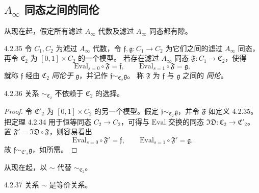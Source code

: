 
\subsection{$A_\infty$ 同态之间的同伦}
\label{subsec:4-2-2}

从现在起，假定所有滤过 $A_\infty$ 代数及滤过 $A_\infty$ 同态都有隙。

\begin{definition}{4.2.35}\label{def:4-2-35}
令 $C_1,C_2$ 为滤过 $A_\infty$ 代数，令
$\mathfrak f,\mathfrak g\colon C_1\to C_2$ 为它们之间的滤过
$A_\infty$ 同态，再令 $\mathfrak C_2$ 为 $[0,1]\times C_2$ 的一个模型。
若存在滤过 $A_\infty$ 同态
$\mathfrak F\colon C_1\to\mathfrak C_2$，使得
\[
 \mathrm{Eval}_{s=0}\circ\mathfrak F=\mathfrak f,
 \qquad
 \mathrm{Eval}_{s=1}\circ\mathfrak F=\mathfrak g,
\]
就称 $\mathfrak f$ 经由 $\mathfrak C_2$ \emph{同伦于}
$\mathfrak g$，并记作
$\mathfrak f\sim_{\mathfrak C_2}\mathfrak g$。
称 $\mathfrak F$ 为 $\mathfrak f$ 与 $\mathfrak g$ 之间的
\emph{同伦}。
\end{definition}

\begin{lemma}{4.2.36}\label{lem:4-2-36}
关系 $\sim_{\mathfrak C_2}$ 不依赖于 $\mathfrak C_2$ 的选择。
\end{lemma}

\begin{proof}
令 $\mathfrak C'_2$ 为 $[0,1]\times C_2$ 的另一个模型。假定
$\mathfrak f\sim_{\mathfrak C_2}\mathfrak g$，并令 $\mathfrak F$ 如定义
4.2.35。把定理 4.2.34 用于恒等同态 $C_2\to C_2$，可得与
$\mathrm{Eval}$ 交换的同态
$\mathfrak{ID}\colon\mathfrak C_2\to\mathfrak C'_2$。置
$\mathfrak F'=\mathfrak{ID}\circ\mathfrak F$，则容易看出
\[
 \mathrm{Eval}_{s=0}\circ\mathfrak F'=\mathfrak f,
 \qquad
 \mathrm{Eval}_{s=1}\circ\mathfrak F'=\mathfrak g.
\]
故 $\mathfrak f\sim_{\mathfrak C'_2}\mathfrak g$，如所需。
\end{proof}

从现在起，以 $\sim$ 代替 $\sim_{\mathfrak C_2}$。

\begin{proposition}{4.2.37}\label{prop:4-2-37}
关系 $\sim$ 是等价关系。
\end{proposition}

